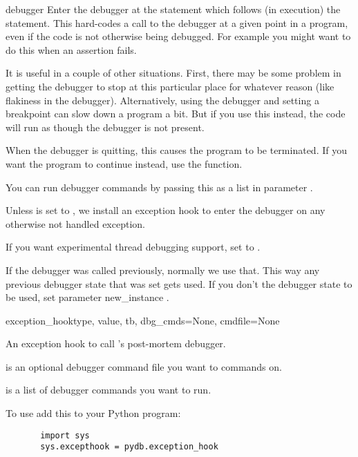 \begin{funcdesc}{debugger}{}\label{debugger}
Enter the debugger at the statement which follows (in execution) the
 statement. This hard-codes a call to the debugger
at a given point in a program, even if the code is not otherwise being
debugged. For example you might want to do this when an assertion
fails.

It is useful in a couple of other situations. First, there may be some
problem in getting the debugger to stop at this particular place for
whatever reason (like flakiness in the debugger). Alternatively, using
the debugger and setting a breakpoint can slow down a program a
bit. But if you use this instead, the code will run as though the
debugger is not present.

When the debugger is quitting, this causes the program to be
terminated. If you want the program to continue instead, use the
 function.

You can run debugger commands by passing this as a list in parameter
.  

Unless  is set to , we install an
exception hook to enter the debugger on any otherwise not handled
exception.

If you want experimental thread debugging support, set
 to .

If the debugger was called previously, normally we use that. This way
any previous debugger state that was set gets used. If you don't the
debugger state to be used, set parameter new_instance .
\end{funcdesc}

\begin{funcdesc}{exception_hook}{type, value, tb, dbg_cmds=None,
    cmdfile=None}

An exception hook to call 's post-mortem debugger.

 is an optional debugger command file you want to 
 commands on.

 is a list of debugger commands you want to run.

To use add this to your Python program:
\begin{verbatim}
       import sys
       sys.excepthook = pydb.exception_hook
\end{verbatim}
\end{funcdesc}

